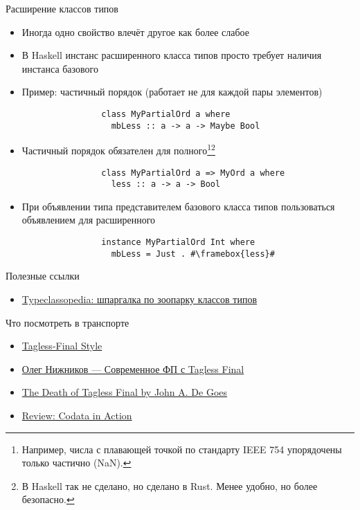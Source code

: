     \begin{frame}[fragile]{Расширение классов типов}
        \begin{itemize}
            \item Иногда одно свойство влечёт другое как более слабое
            \item В Haskell инстанс расширенного класса типов  просто требует наличия инстанса базового
            \item Пример: частичный порядок (работает не для каждой пары элементов)
            \begin{verbatim}
                class MyPartialOrd a where
                  mbLess :: a -> a -> Maybe Bool
            \end{verbatim}
            \item Частичный порядок обязателен для полного\footnote{Например, числа с плавающей точкой по стандарту IEEE 754 упорядочены только частично (NaN).}\footnote{В Haskell так не сделано, но сделано в Rust. Менее удобно, но более безопасно.}
            \begin{verbatim}
                class MyPartialOrd a => MyOrd a where
                  less :: a -> a -> Bool
            \end{verbatim}
            \item При объявлении типа представителем базового класса типов пользоваться объявлением для расширенного
            \begin{verbatim}
                instance MyPartialOrd Int where
                  mbLess = Just . #\framebox{less}#
            \end{verbatim}
        \end{itemize}
    \end{frame}


    \begin{frame}{Полезные ссылки}
        \begin{itemize}
            \item \href{https://wiki.haskell.org/Typeclassopedia}{\color{blue} Typeclassopedia: шпаргалка по зоопарку классов типов}
        \end{itemize}
    \end{frame}

    \begin{frame}{Что посмотреть в транспорте}
        \begin{itemize}
            \item \href{https://youtu.be/MbFqJ2NHS8M?si=LamIrSnrjbwCYrt2}{\color{blue}  Tagless-Final Style}
            \item \href{https://youtu.be/sWEtnq0ReZA?si=CxcESs7hoj73Kc7e}{\color{blue}  Олег Нижников — Современное ФП с Tagless Final}
            \item \href{https://youtu.be/p98W4bUtbO8?si=fU7dtXL3DnXEs75h}{\color{blue} The Death of Tagless Final by John A. De Goes}
            \item \href{https://reasonablypolymorphic.com/blog/review-codata/index.html}{\color{blue} Review: Codata in Action}
        \end{itemize}
    \end{frame}

